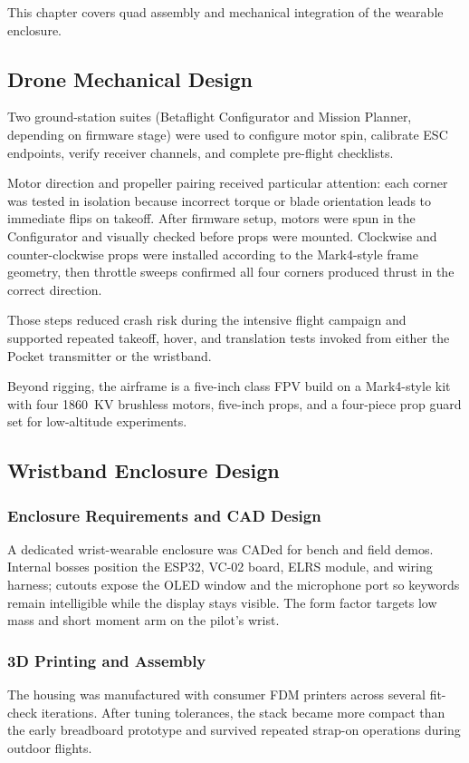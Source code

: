 This chapter covers quad assembly and mechanical integration of the wearable enclosure.

\subsection{Drone Mechanical Design}
\label{subsec:drone}

Two ground-station suites (Betaflight Configurator and Mission Planner, depending on firmware stage)
were used to configure motor spin, calibrate ESC endpoints, verify receiver channels, and complete
pre-flight checklists.

Motor direction and propeller pairing received particular attention: each corner was tested in
isolation because incorrect torque or blade orientation leads to immediate flips on takeoff.
After firmware setup, motors were spun in the Configurator and visually checked before props were
mounted.
Clockwise and counter-clockwise props were installed according to the Mark4-style frame geometry,
then throttle sweeps confirmed all four corners produced thrust in the correct direction.

Those steps reduced crash risk during the intensive flight campaign and supported repeated takeoff,
hover, and translation tests invoked from either the Pocket transmitter or the wristband.

Beyond rigging, the airframe is a five-inch class FPV build on a Mark4-style kit with four 1860~KV
brushless motors, five-inch props, and a four-piece prop guard set for low-altitude experiments.

\subsection{Wristband Enclosure Design}

\subsubsection{Enclosure Requirements and CAD Design}

A dedicated wrist-wearable enclosure was CADed for bench and field demos.
Internal bosses position the ESP32, VC-02 board, ELRS module, and wiring harness; cutouts expose the
OLED window and the microphone port so keywords remain intelligible while the display stays visible.
The form factor targets low mass and short moment arm on the pilot's wrist.

\subsubsection{3D Printing and Assembly}

The housing was manufactured with consumer FDM printers across several fit-check iterations.
After tuning tolerances, the stack became more compact than the early breadboard prototype and
survived repeated strap-on operations during outdoor flights.
